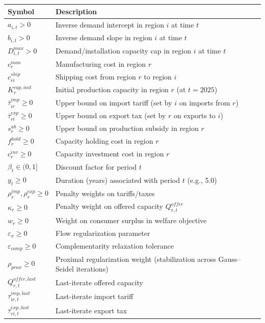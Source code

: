 \begin{flushleft}
\begin{tabular}{@{}lp{10cm}@{}}
\toprule
\textbf{Symbol} & \textbf{Description} \\
\midrule
$a_{i,t} > 0$ & Inverse demand intercept in region $i$ at time $t$ \\
$b_{i,t} > 0$ & Inverse demand slope in region $i$ at time $t$ \\
$D^{max}_{i,t} > 0$ & Demand/installation capacity cap in region $i$ at time $t$ \\
$c^{man}_r$ & Manufacturing cost in region $r$ \\
$c^{ship}_{ri}$ & Shipping cost from region $r$ to region $i$ \\
$K^{cap,init}_r$ & Initial production capacity in region $r$ (at $t=2025$) \\
$\overline{\tau}^{imp}_{ir} \ge 0$ & Upper bound on import tariff (set by $i$ on imports from $r$) \\
$\overline{\tau}^{exp}_{ri} \ge 0$ & Upper bound on export tax (set by $r$ on exports to $i$) \\
$s^{ub}_r \ge 0$ & Upper bound on production subsidy in region $r$ \\
$f^{hold}_r \ge 0$ & Capacity holding cost in region $r$ \\
$c^{inv}_r \ge 0$ & Capacity investment cost in region $r$ \\
$\beta_t \in (0,1]$ & Discount factor for period $t$ \\
$y_t \ge 0$ & Duration (years) associated with period $t$ (e.g., 5.0) \\
$\rho^{imp}_r, \rho^{exp}_r \ge 0$ & Penalty weights on tariffs/taxes \\
$\kappa_r \ge 0$ & Penalty weight on offered capacity $Q^{offer}_{r,t}$ \\
$w_r \ge 0$ & Weight on consumer surplus in welfare objective \\
$\varepsilon_x \ge 0$ & Flow regularization parameter \\
$\varepsilon_{comp} \ge 0$ & Complementarity relaxation tolerance \\
$\rho_{prox} \ge 0$ & Proximal regularization weight (stabilization across Gauss--Seidel iterations) \\
$Q^{offer,last}_{r,t}$ & Last-iterate offered capacity \\
$\tau^{imp,last}_{ir,t}$ & Last-iterate import tariff \\
$\tau^{exp,last}_{ri,t}$ & Last-iterate export tax \\
\bottomrule
\end{tabular}
\end{flushleft}

